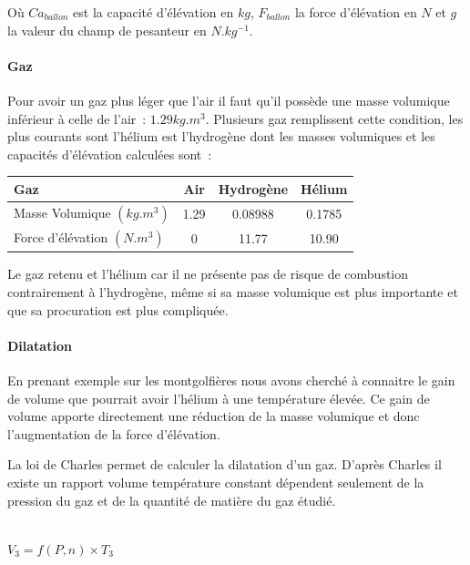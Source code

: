 \documentclass[a4paper,11pt]{article}
\begin{document}
Où $Ca_{ballon}$ est la capacité d'élévation en $kg$, $F_{ballon}$ la force d'élévation en $N$ et $g$ la valeur du champ de pesanteur en $N.kg^{-1}$.

\paragraph{Gaz}

Pour avoir un gaz plus léger que l'air il faut qu'il possède une masse volumique inférieur à celle de l'air~: $1.29kg.m^3$. Plusieurs gaz remplissent cette condition, les plus courants sont l'hélium est l'hydrogène dont les masses volumiques et les capacités d'élévation calculées sont~:

\begin{center}
	\begin{tabular}{|l|c|c|c|}
		\hline
		Gaz & Air & Hydrogène & Hélium \\
		\hline
		Masse Volumique $(kg.m^3)$ & 1.29 & 0.08988 & 0.1785 \\
		\hline
		Force d'élévation $(N.m^3)$ & 0 & 11.77 & 10.90 \\
		\hline
	\end{tabular}
\end{center}

Le gaz retenu et l'hélium car il ne présente pas de risque de combustion contrairement à l'hydrogène, même si sa masse volumique est plus importante et que sa procuration est plus compliquée.

\paragraph{Dilatation}

En prenant exemple sur les montgolfières nous avons cherché à connaitre le gain de volume que pourrait avoir l'hélium à une température élevée. Ce gain de volume apporte directement une réduction de la masse volumique et donc l'augmentation de la force d'élévation.

La loi de Charles permet de calculer la dilatation d'un gaz. D'après Charles il existe un rapport volume température constant dépendent seulement de la pression du gaz et de la quantité de matière du gaz étudié.

\begin{center}
  \\
 $\displaystyle{V_3 = f(P, n) \times T_3}$
\end{center}
\end{document}
